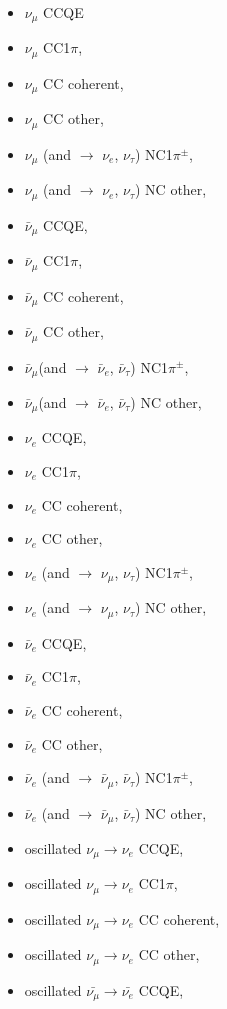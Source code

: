 \begin{itemize}
\item  $\nu_{\mu}$ CCQE
\item  $\nu_{\mu}$ CC1$\pi$, 
\item  $\nu_{\mu}$ CC coherent, 
\item  $\nu_{\mu}$ CC other, 
\item  $\nu_{\mu}$ (and $\rightarrow$ $\nu_{e}$, $\nu_{\tau}$) NC1$\pi^{\pm}$, 
\item  $\nu_{\mu}$ (and $\rightarrow$ $\nu_{e}$, $\nu_{\tau}$) NC other, 
\item  $\bar{\nu}_{\mu}$ CCQE, 
\item  $\bar{\nu}_{\mu}$ CC1$\pi$, 
\item  $\bar{\nu}_{\mu}$ CC coherent, 
\item  $\bar{\nu}_{\mu}$ CC other, 
\item  $\bar{\nu}_{\mu}$(and $\rightarrow$ $\bar{\nu}_{e}$, $\bar{\nu}_{\tau}$) NC1$\pi^{\pm}$, 
\item  $\bar{\nu}_{\mu}$(and $\rightarrow$ $\bar{\nu}_{e}$, $\bar{\nu}_{\tau}$) NC other, 
\item  $\nu_{e}$ CCQE, 
\item  $\nu_{e}$ CC1$\pi$,
\item  $\nu_{e}$ CC coherent,
\item  $\nu_{e}$ CC other,
\item  $\nu_{e}$ (and $\rightarrow$ $\nu_{\mu}$, $\nu_{\tau}$) NC1$\pi^{\pm}$,
\item  $\nu_{e}$ (and $\rightarrow$ $\nu_{\mu}$, $\nu_{\tau}$) NC other,
\item  $\bar{\nu}_{e}$ CCQE, 
\item  $\bar{\nu}_{e}$ CC1$\pi$,
\item  $\bar{\nu}_{e}$ CC coherent,
\item  $\bar{\nu}_{e}$ CC other,
\item  $\bar{\nu}_{e}$ (and $\rightarrow$ $\bar{\nu}_{\mu}$, $\bar{\nu}_{\tau}$) NC1$\pi^{\pm}$,
\item  $\bar{\nu}_{e}$ (and $\rightarrow$ $\bar{\nu}_{\mu}$, $\bar{\nu}_{\tau}$) NC other,
\item  oscillated $\nu_{\mu} \rightarrow \nu_{e}$ CCQE,
\item  oscillated $\nu_{\mu} \rightarrow \nu_{e}$ CC1$\pi$,
\item  oscillated $\nu_{\mu} \rightarrow \nu_{e}$ CC coherent,
\item  oscillated $\nu_{\mu} \rightarrow \nu_{e}$ CC other,
\item  oscillated $\bar{\nu_{\mu}} \rightarrow \bar{\nu_{e}}$ CCQE,

\end{itemize}
